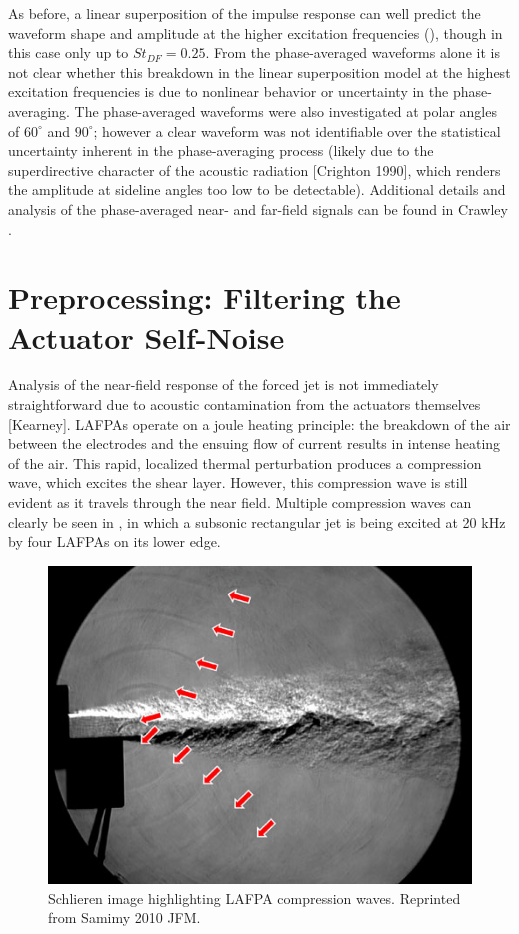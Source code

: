 As before, a linear superposition of the impulse response can well predict the waveform shape and amplitude at the higher excitation frequencies (), though in this case only up to $St_{DF}  = 0.25$. 
From the phase-averaged waveforms alone it is not clear whether this breakdown in the linear superposition model at the highest excitation frequencies is due to nonlinear behavior or uncertainty in the phase-averaging. 
The phase-averaged waveforms were also investigated at polar angles of $60^\circ$ and $90^\circ$; however a clear waveform was not identifiable over the statistical uncertainty inherent in the phase-averaging process (likely due to the superdirective character of the acoustic radiation [Crighton 1990], which renders the amplitude at sideline angles too low to be detectable).
Additional details and analysis of the phase-averaged near- and far-field signals can be found in Crawley \etal [cite].

\section{Preprocessing: Filtering the Actuator Self-Noise}
Analysis of the near-field response of the forced jet is not immediately straightforward due to acoustic contamination from the actuators themselves [Kearney]. 
LAFPAs operate on a joule heating principle: the breakdown of the air between the electrodes and the ensuing flow of current results in intense heating of the air. This rapid, localized thermal perturbation produces a compression wave, which excites the shear layer. 
However, this compression wave is still evident as it travels through the near field. 
Multiple compression waves can clearly be seen in , in which a subsonic rectangular jet is being excited at 20 kHz by four LAFPAs on its lower edge. \begin{figure}
	\centering
	\includegraphics{Figures/Samimy2010JFM.jpg}
	\caption{Schlieren image highlighting LAFPA compression waves. Reprinted from Samimy 2010 JFM.}
	\label{fig:self-noise}
\end{figure}

